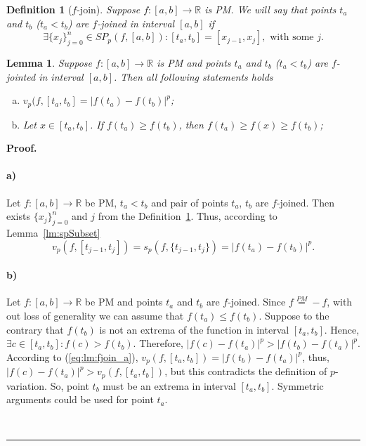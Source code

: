 \documentclass[12pt, a4paper]{article}
\newtheorem{lemma}[theorem]{Lemma}
\newtheorem{definition}[theorem]{Definition}
\newenvironment{proof}[1][Proof]{\noindent \textbf{#1.} }{\  \rule{0.5em}{0.5em}}
\numberwithin{equation}{section}
\begin{document}
\begin{definition}[$f$-join]\label{def:fjoin}
  Suppose $f:[a,b] \rightarrow \mathbb{R}$ is PM.
  We will say that points $t_a$ and $t_b$ ($t_a<t_b$) 
  are \emph{$f$-joined} in interval $[a,b]$ if 
  \begin{equation}
    \exists \{x_j\}_{j=0}^{n} \in SP_{p}(f,[a,b]):
      [t_a,t_b]=[x_{j-1},x_j], \text{ with some } j.
  \end{equation}  
\end{definition}

\begin{lemma}\label{lm:fjoin} 
  Suppose $f:[a,b] \rightarrow \mathbb{R}$ is PM and 
  points $t_a$ and $t_b$ ($t_a<t_b$) are 
  $f$-jointed in interval $[a,b]$.
  Then all following statements holds   
  \begin{enumerate}[a)]
    \item \label{lm:fjoin_a} 
    $v_p(f, [t_a,t_b] = \left|f(t_a)-f(t_b)\right|^p$;
    
    \item \label{lm:fjoin_b} 
    Let $x \in [t_a, t_b]$. 
    If $f(t_a) \geq f(t_b)$, then $f(t_a) \geq f(x) \geq f(t_b)$;
    
  \end{enumerate}
\end{lemma}
\begin{proof}
  \paragraph*{a)}
  Let $f:[a,b] \rightarrow \mathbb{R}$  be PM, 
  $t_a<t_b$ and pair of points $t_a$, $t_b$ are $f$-joined. 
  Then exists $\{x_j\}_{j=0}^{n}$ and $j$ from the
  Definition~\ref{def:fjoin}.
  Thus, according to Lemma~\ref{lm:spSubset}
  \begin{equation}\label{eq:lm:fjoin_a}
    v_p(f,[t_{j-1}, t_j]) = 
      s_p\left(f,\{t_{j-1}, t_j\}\right) = \left|f(t_a)-f(t_b)\right|^p.
  \end{equation}      
  
  \paragraph*{b)}
  Let $f:[a,b] \rightarrow \mathbb{R}$ be PM 
  and points $t_a$ and $t_b$ are $f$-joined.
  Since $f \stackrel{PM}{=} -f$, with out loss of 
  generality we can assume that
  $f(t_a) \leq f(t_b)$.  
  Suppose to the contrary that $f(t_b)$ 
  is not an extrema of the function in interval $[t_a,t_b]$.
  Hence, $\exists c \in [t_a, t_b]: f(c)>f(t_b)$. Therefore,
  $|f(c)-f(t_a)|^p>|f(t_b)-f(t_a)|^p$.
  According to (\ref{eq:lm:fjoin_a}), 
  $v_p(f,[t_a,t_b])=|f(t_b)-f(t_a)|^p$, 
  thus, $|f(c)-f(t_a)|^p>v_p(f,[t_a,t_b])$,
  but this contradicts the definition of $p$-variation.  
  So, point $t_b$ must be an extrema in interval $[t_a,t_b]$.
  Symmetric arguments could be used for point $t_a$.  
  
  
\end{proof}
\end{document}
